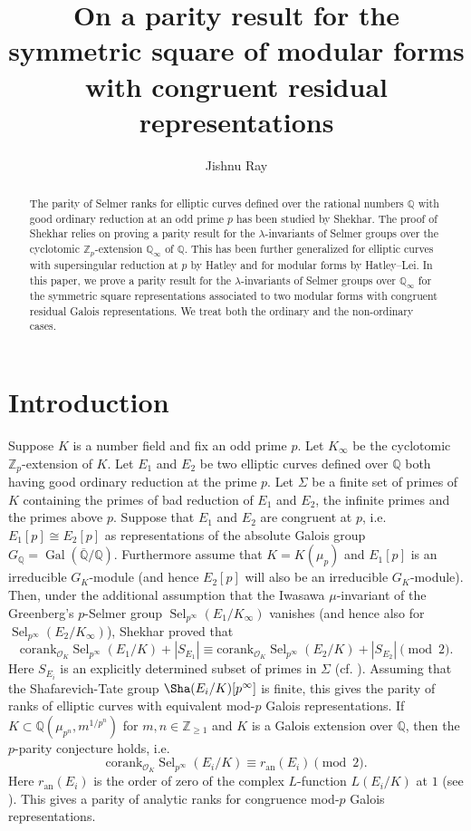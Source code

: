 \documentclass{amsart}
\title[~]{On a parity result for the symmetric square of modular forms with congruent residual representations}
\author[Ray]{Jishnu Ray}
\renewcommand{\geq}{\geqslant}
\newcommand{\Q}{\mathbb{Q}}
\newcommand{\Z}{\mathbb{Z}}
\newcommand{\Gal}{\operatorname{Gal}}
\newcommand{\Sel}{\operatorname{Sel}}
\renewcommand{\O}{\mathcal{O}}
\newtheorem{auxiliary proposition}[theorem]{Auxiliary Proposition}
\newtheorem{main conjecture}[theorem]{Main Conjecture}
\newtheorem{main theorem}[theorem]{Main Theorem}
\newtheorem{modesty proposition}[theorem]{Modesty Proposition}
\newtheorem{open problem}[theorem]{Open Problem}
\newtheorem{convergence lemma}[theorem]{Convergence Lemma}
\newtheorem{corrected lemma}[theorem]{Corrected Lemma}
\newtheorem{growth lemma}[theorem]{Growth Lemma}
\newtheorem{coefficient lemma}[theorem]{Integrality Lemma}
\newtheorem{interpolation lemma}[theorem]{Interpolation Lemma}
\newtheorem{kernel lemma}[theorem]{Kernel Lemma}
\newtheorem{limit lemma}[theorem]{Limit Lemma}
\newtheorem{tandem lemma}[theorem]{Modesty Lemma}
\newtheorem{zero-finding lemma}[theorem]{Zero-Finding Lemma}
\begin{document}
\maketitle
\begin{abstract}
    The parity of Selmer ranks for elliptic curves defined over the rational numbers $\Q$ with good ordinary reduction at an odd prime $p$ has been studied by Shekhar. The proof of Shekhar relies on proving a parity result for  the $\lambda$-invariants of Selmer groups over the cyclotomic $\Z_p$-extension $\Q_\infty$ of $\Q$.
    This has been further generalized for elliptic curves with supersingular reduction at $p$ by Hatley and for modular forms by Hatley--Lei. In this paper, we prove a parity result for the $\lambda$-invariants of Selmer groups over $\Q_\infty$ for the symmetric square representations associated to two modular forms  with congruent residual Galois representations. We treat both the ordinary and the non-ordinary cases. 
\end{abstract}
\section{Introduction}
Suppose $K$ is a number field and fix an odd prime $p$. Let $K_\infty$ be the cyclotomic $\Z_p$-extension of $K$. Let $E_1$ and $E_2$ be two elliptic curves defined over $\Q$ both having good ordinary reduction at the prime $p$. Let $\Sigma$ be a finite set of primes of $K$ containing the primes of bad reduction of $E_1$ and $E_2$, the infinite primes and the primes above $p$. Suppose that $E_1$ and $E_2$ are congruent at $p$, i.e. $E_1[p] \cong E_2[p]$ as representations of the absolute Galois group $G_\Q=\Gal(\overline{\Q}/\Q)$. Furthermore assume that $K=K(\mu_p)$ and  $E_1[p]$ is an irreducible $G_K$-module (and hence $E_2[p]$ will also be an irreducible $G_K$-module). Then, under the additional assumption that the Iwasawa $\mu$-invariant of the Greenberg's $p$-Selmer group $\Sel_{p^\infty}(E_1/K_\infty)$ vanishes (and hence also for $\Sel_{p^\infty}(E_2/K_\infty)$), Shekhar proved that 
\begin{equation}\label{Shekhar}
   \mathrm{corank}_{\O_K}\Sel_{p^\infty}(E_1/K) +|S_{E_1}| \equiv \mathrm{corank}_{\O_K}\Sel_{p^\infty}(E_2/K) +|S_{E_2}| \pmod{2}. 
\end{equation}
Here $S_{E_i}$ is an explicitly determined subset of primes in $\Sigma$ (cf. \cite[Theorem 1.1]{Shekhar16}). Assuming that the Shafarevich-Tate group $\Sha(E_i/K)[p^\infty]$ is finite, this gives the parity of ranks of elliptic curves with equivalent mod-$p$ Galois representations. If $K \subset \Q(\mu_{p^n},m^{1/p^n})$ for $m,n \in \Z_{\geq 1}$ and $K$ is a Galois extension over $\Q$, then the $p$-parity conjecture holds, i.e. 
$$\mathrm{corank}_{\O_K}\Sel_{p^\infty}(E_i/K) \equiv r_{\mathrm{an}}(E_i) \pmod{2}.$$
Here $r_{\mathrm{an}}(E_i)$ is the order of zero of the complex $L$-function $L(E_i/K)$ at $1$ (see \cite[Conjecture 1 and Theorem 4.3]{Shekhar16}). This gives a parity of analytic ranks for congruence mod-$p$ Galois representations.
\end{document}
